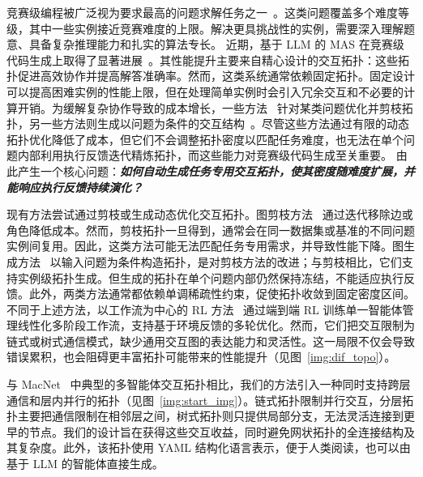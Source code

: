 \documentclass{article}
\theoremstyle{definition}
\begin{document}
竞赛级编程被广泛视为要求最高的问题求解任务之一~\citep{khan2023xcodeeval, hendrycks2021measuring}。这类问题覆盖多个难度等级，其中一些实例接近竞赛难度的上限。解决更具挑战性的实例，需要深入理解题意、具备复杂推理能力和扎实的算法专长。
近期，基于 LLM 的 MAS 在竞赛级代码生成上取得了显著进展~\citep{islam2024mapcoder, islam2025codesim}。其性能提升主要来自精心设计的交互拓扑：这些拓扑促进高效协作并提高解答准确率。然而，这类系统通常依赖固定拓扑。固定设计可以提高困难实例的性能上限，但在处理简单实例时会引入冗余交互和不必要的计算开销。为缓解复杂协作导致的成本增长，一些方法~\citep{zhang2024cut, wang2025agentdropout} 针对某类问题优化并剪枝拓扑，另一些方法则生成以问题为条件的交互结构~\citep{zhang2024g}。尽管这些方法通过有限的动态拓扑优化降低了成本，但它们不会调整拓扑密度以匹配任务难度，也无法在单个问题内部利用执行反馈迭代精炼拓扑，而这些能力对竞赛级代码生成至关重要。
由此产生一个核心问题：\textbf{\textit{如何自动生成任务专用交互拓扑，使其密度随难度扩展，并能响应执行反馈持续演化？}}




现有方法尝试通过剪枝或生成动态优化交互拓扑。图剪枝方法~\citep{zhang2024cut, zhuge2024gptswarm} 通过迭代移除边或角色降低成本。然而，剪枝拓扑一旦得到，通常会在同一数据集或基准的不同问题实例间复用。因此，这类方法可能无法匹配任务专用需求，并导致性能下降。图生成方法~\citep{zhang2024g} 以输入问题为条件构造拓扑，是对剪枝方法的改进；与剪枝相比，它们支持实例级拓扑生成。但生成的拓扑在单个问题内部仍然保持冻结，不能适应执行反馈。此外，两类方法通常都依赖单调稀疏性约束，促使拓扑收敛到固定密度区间。不同于上述方法，以工作流为中心的 RL 方法~\citep{gao2025flowreasoner, li2025chain} 通过端到端 RL 训练单一智能体管理线性化多阶段工作流，支持基于环境反馈的多轮优化。然而，它们把交互限制为链式或树式通信模式，缺少通用交互图的表达能力和灵活性。这一局限不仅会导致错误累积，也会阻碍更丰富拓扑可能带来的性能提升（见图~\ref{img:dif_topo}）。


与 MacNet~\citep{qian2024scaling} 中典型的多智能体交互拓扑相比，我们的方法引入一种同时支持跨层通信和层内并行的拓扑（见图~\ref{img:start_img}）。链式拓扑限制并行交互，分层拓扑主要把通信限制在相邻层之间，树式拓扑则只提供局部分支，无法灵活连接到更早的节点。我们的设计旨在获得这些交互收益，同时避免网状拓扑的全连接结构及其复杂度。此外，该拓扑使用 YAML 结构化语言表示，便于人类阅读，也可以由基于 LLM 的智能体直接生成。
\end{document}
